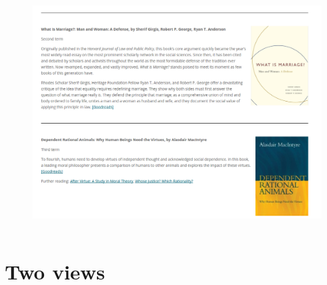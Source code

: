 \documentclass[xcolor=dvipsnames]{beamer}
\begin{document}
\begin{frame}[plain]
  \begin{columns}[T] %
    \begin{column}{0.99\textwidth}
      \begin{figure}[H]
        \centering
        \includegraphics[width=0.99\textwidth]{marriage}
      \end{figure}
    \end{column}%
  \end{columns}
\end{frame}




\section{Two views}
\end{document}
